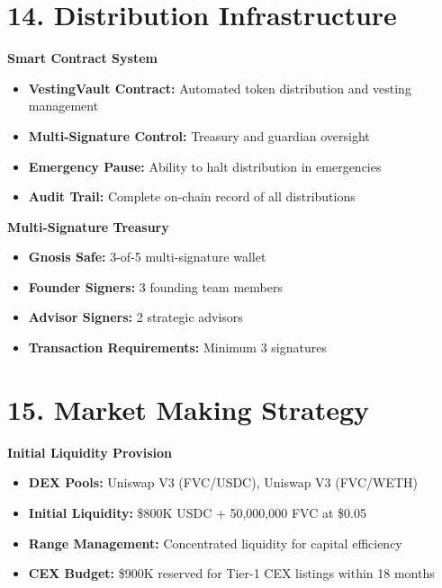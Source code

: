 \documentclass[
  paper=a4,
  ,captions=tableheading
]{scrartcl}
\providecommand{\tightlist}{%
  \setlength{\itemsep}{0pt}\setlength{\parskip}{0pt}}
\begin{document}
\section{14. Distribution
Infrastructure}\label{distribution-infrastructure}

\textbf{Smart Contract System}

\begin{itemize}
\tightlist
\item
  \textbf{VestingVault Contract:} Automated token distribution and
  vesting management
\item
  \textbf{Multi-Signature Control:} Treasury and guardian oversight
\item
  \textbf{Emergency Pause:} Ability to halt distribution in emergencies
\item
  \textbf{Audit Trail:} Complete on-chain record of all distributions
\end{itemize}

\textbf{Multi-Signature Treasury}

\begin{itemize}
\tightlist
\item
  \textbf{Gnosis Safe:} 3-of-5 multi-signature wallet
\item
  \textbf{Founder Signers:} 3 founding team members
\item
  \textbf{Advisor Signers:} 2 strategic advisors
\item
  \textbf{Transaction Requirements:} Minimum 3 signatures
\end{itemize}

\section{15. Market Making Strategy}\label{market-making-strategy}

\textbf{Initial Liquidity Provision}

\begin{itemize}
\tightlist
\item
  \textbf{DEX Pools:} Uniswap V3 (FVC/USDC), Uniswap V3 (FVC/WETH)
\item
  \textbf{Initial Liquidity:} \$800K USDC + 50,000,000 FVC at \$0.05
\item
  \textbf{Range Management:} Concentrated liquidity for capital
  efficiency
\item
  \textbf{CEX Budget:} \$900K reserved for Tier-1 CEX listings within 18 months
\end{itemize}
\end{document}
